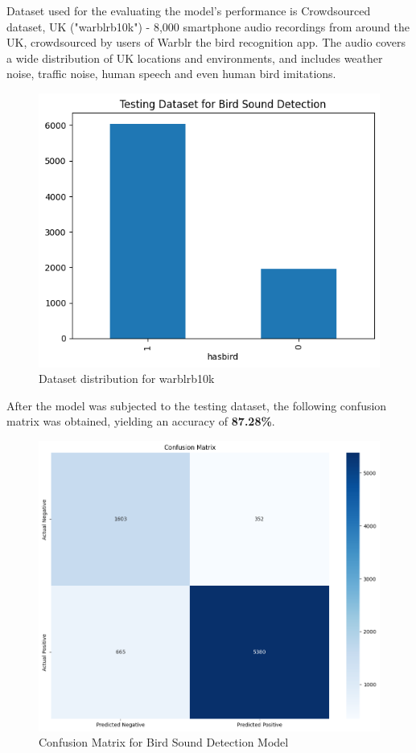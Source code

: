 Dataset used for the evaluating the model's performance is Crowdsourced dataset, UK ("warblrb10k") - 8,000 smartphone audio recordings from around the UK, crowdsourced by users of Warblr the bird recognition app. The audio covers a wide distribution of UK locations and environments, and includes weather noise, traffic noise, human speech and even human bird imitations.
\begin{figure}[h!]
    \centering
    \includegraphics[scale=0.45]{images/det_testingdataset.png}
    \caption{Dataset distribution for warblrb10k}
    \label{fig:warblrb10k dataset}
\end{figure}
\newpage
After the model was subjected to the testing dataset, the following confusion matrix was obtained, yielding an accuracy of \textbf{87.28\%}.
\begin{figure}[h!]
    \centering
    \includegraphics[scale=0.35]{images/det_confusionmatrix.png}
    \caption{Confusion Matrix for Bird Sound Detection Model}
    \label{fig:Confusion Matrix for Detection Model}
\end{figure}

